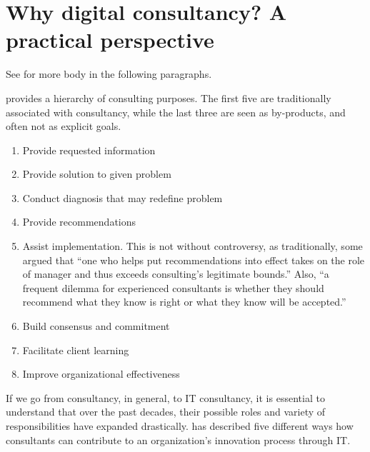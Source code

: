 \documentclass[12pt]{article}
\providecommand{\tightlist}{%
  \setlength{\itemsep}{0pt}\setlength{\parskip}{0pt}}
\begin{document}
\hypertarget{why-digital-consultancy-a-practical-perspective}{%
\section{Why digital consultancy? A practical
perspective}\label{why-digital-consultancy-a-practical-perspective}}

See \citet{lacity1994} for more body in the following paragraphs.

\citet{turner1982} provides a hierarchy of consulting purposes. The
first five are traditionally associated with consultancy, while the last
three are seen as by-products, and often not as explicit goals.

\begin{enumerate}
\def\labelenumi{\arabic{enumi}.}
\tightlist
\item
  Provide requested information
\item
  Provide solution to given problem
\item
  Conduct diagnosis that may redefine problem
\item
  Provide recommendations
\item
  Assist implementation. This is not without controversy, as
  traditionally, some argued that ``one who helps put recommendations
  into effect takes on the role of manager and thus exceeds consulting's
  legitimate bounds.'' Also, ``a frequent dilemma for experienced
  consultants is whether they should recommend what they know is right
  or what they know will be accepted.''
\item
  Build consensus and commitment
\item
  Facilitate client learning
\item
  Improve organizational effectiveness
\end{enumerate}

If we go from consultancy, in general, to IT consultancy, it is
essential to understand that over the past decades, their possible roles
and variety of responsibilities have expanded drastically.
\citet[20-25]{swanson2010} has described five different ways how
consultants can contribute to an organization's innovation process
through IT.
\end{document}
